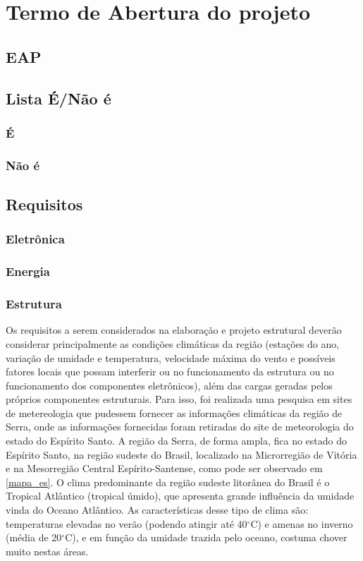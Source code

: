 \chapter{Termo de Abertura do projeto}

\section{EAP}
\section{Lista É/Não é}
\subsection{É}
\subsection{Não é}
\section{Requisitos}
\subsection{Eletrônica}
\subsection{Energia}
\subsection{Estrutura}


Os requisitos a serem considerados na elabora\c c\~ao e projeto estrutural dever\~ao considerar principalmente as condi\c c\~oes clim\'aticas da regi\~ao (esta\c c\~oes do ano, varia\c c\~ao de umidade e temperatura, velocidade m\'axima do vento e poss\'iveis fatores locais que possam interferir ou no funcionamento da estrutura ou no funcionamento dos componentes eletr\^onicos), al\'em das cargas geradas pelos próprios componentes estruturais. Para isso, foi realizada uma pesquisa em sites de metereologia que pudessem fornecer as informa\c c\~oes clim\'aticas da regi\~ao de Serra, onde as informações fornecidas foram retiradas do site de meteorologia do estado do Esp\'irito Santo.
A regi\~ao da Serra, de forma ampla, fica no estado do Esp\'irito Santo, na regi\~ao sudeste do Brasil, localizado na Microrregi\~ao de Vit\'oria e na Mesorregi\~ao Central Esp\'irito-Santense, como pode ser observado em \ref{mapa_es}. O clima predominante da regi\~ao sudeste litor\^anea do Brasil \'e o Tropical Atl\^antico (tropical \'umido), que apresenta grande influ\^encia da umidade vinda do Oceano Atl\^antico. As caracter\'isticas desse tipo de clima s\~ao: temperaturas elevadas no ver\~ao (podendo atingir at\'e 40$^\circ$C) e amenas no inverno (m\'edia de 20$^\circ$C), e em fun\c c\~ao da umidade trazida pelo oceano, costuma chover muito nestas \'areas.

